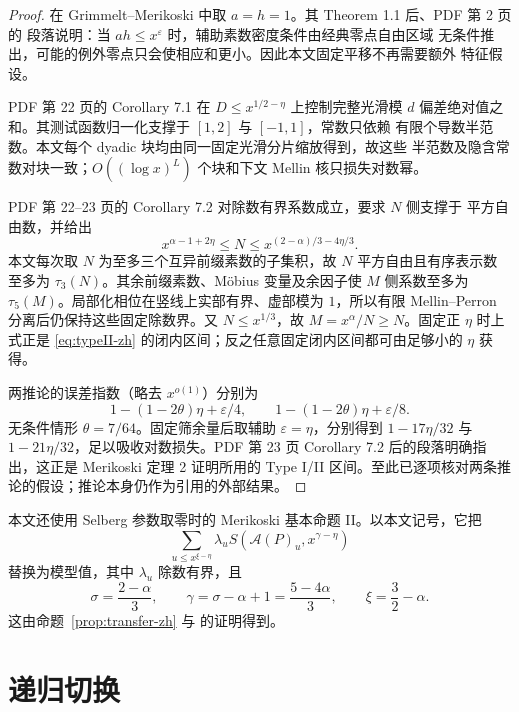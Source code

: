 \documentclass[UTF8,10pt,a4paper]{ctexart}
\newcommand{\Acal}{\mathcal{A}}
\newcommand{\1}{\mathbf{1}}
\theoremstyle{remark}
\begin{document}
\begin{proof}
在 Grimmelt--Merikoski 中取 $a=h=1$。其 Theorem 1.1 后、PDF 第 2 页的
段落说明：当 $ah\le x^\varepsilon$ 时，辅助素数密度条件由经典零点自由区域
无条件推出，可能的例外零点只会使相应和更小。因此本文固定平移不再需要额外
特征假设。

PDF 第 22 页的 Corollary 7.1 在 $D\le x^{1/2-\eta}$ 上控制完整光滑模
$d$ 偏差绝对值之和。其测试函数归一化支撑于 $[1,2]$ 与 $[-1,1]$，常数只依赖
有限个导数半范数。本文每个 dyadic 块均由同一固定光滑分片缩放得到，故这些
半范数及隐含常数对块一致；$O((\log x)^L)$ 个块和下文 Mellin 核只损失对数幂。

PDF 第 22--23 页的 Corollary 7.2 对除数有界系数成立，要求 $N$ 侧支撑于
平方自由数，并给出
\[
 x^{\alpha-1+2\eta}\le N
 \le x^{(2-\alpha)/3-4\eta/3}.
\]
本文每次取 $N$ 为至多三个互异前缀素数的子集积，故 $N$ 平方自由且有序表示数
至多为 $\tau_3(N)$。其余前缀素数、Möbius 变量及余因子使 $M$ 侧系数至多为
$\tau_5(M)$。局部化相位在竖线上实部有界、虚部模为 $1$，所以有限
Mellin--Perron 分离后仍保持这些固定除数界。又 $N\le x^{1/3}$，故
$M=x^\alpha/N\ge N$。固定正 $\eta$ 时上式正是
\eqref{eq:typeII-zh} 的闭内区间；反之任意固定闭内区间都可由足够小的 $\eta$
获得。

两推论的误差指数（略去 $x^{o(1)}$）分别为
\[
 1-(1-2\theta)\eta+\varepsilon/4,
 \qquad 1-(1-2\theta)\eta+\varepsilon/8.
\]
无条件情形 $\theta=7/64$。固定筛余量后取辅助 $\varepsilon=\eta$，分别得到
$1-17\eta/32$ 与 $1-21\eta/32$，足以吸收对数损失。PDF 第 23 页
Corollary 7.2 后的段落明确指出，这正是 Merikoski 定理 2 证明所用的
Type I/II 区间。至此已逐项核对两条推论的假设；推论本身仍作为引用的外部结果。
\end{proof}

本文还使用 Selberg 参数取零时的 Merikoski 基本命题 II。以本文记号，它把
\begin{equation}\label{eq:fundamentalII-zh}
 \sum_{u\le x^{\xi-\eta}}\lambda_u
 S(\Acal(P)_u,x^{\gamma-\eta})
\end{equation}
替换为模型值，其中 $\lambda_u$ 除数有界，且
\begin{equation}\label{eq:parameters-zh}
 \sigma=\frac{2-\alpha}{3},\qquad
 \gamma=\sigma-\alpha+1=\frac{5-4\alpha}{3},\qquad
 \xi=\frac32-\alpha.
\end{equation}
这由命题~\ref{prop:transfer-zh} 与 \cite[Proposition 6]{Merikoski2020}
的证明得到。

\section{递归切换}\label{sec:switching-zh}
\end{document}
